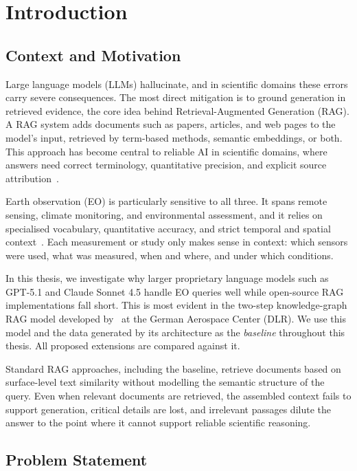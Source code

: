 \chapter{Introduction}
\label{chap:introduction}

\section{Context and Motivation}
\label{sec:context}

Large language models (LLMs) hallucinate, and in scientific domains these errors carry severe consequences. The most direct mitigation is to ground generation in retrieved evidence, the core idea behind Retrieval-Augmented Generation (RAG). A RAG system adds documents such as papers, articles, and web pages to the model's input, retrieved by term-based methods, semantic embeddings, or both. This approach has become central to reliable AI in scientific domains, where answers need correct terminology, quantitative precision, and explicit source attribution~\citep{lewis2020retrieval}.

Earth observation (EO) is particularly sensitive to all three. It spans remote sensing, climate monitoring, and environmental assessment, and it relies on specialised vocabulary, quantitative accuracy, and strict temporal and spatial context~\citep{aschbacher2020earth}. Each measurement or study only makes sense in context: which sensors were used, what was measured, when and where, and under which conditions.

In this thesis, we investigate why larger proprietary language models such as GPT-5.1 and Claude Sonnet 4.5 handle EO queries well while open-source RAG implementations fall short. This is most evident in the two-step knowledge-graph RAG model developed by~\citet{elbaff2025earthobservationrag} at the German Aerospace Center (DLR). We use this model and the data generated by its architecture as the \emph{baseline} throughout this thesis. All proposed extensions are compared against it.

Standard RAG approaches, including the baseline, retrieve documents based on surface-level text similarity without modelling the semantic structure of the query. Even when relevant documents are retrieved, the assembled context fails to support generation, critical details are lost, and irrelevant passages dilute the answer to the point where it cannot support reliable scientific reasoning.

\section{Problem Statement}
\label{sec:problem}

